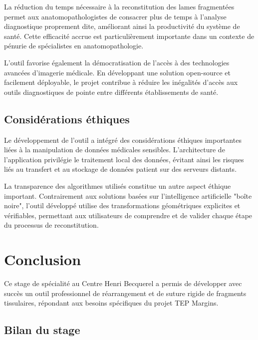 \documentclass[12pt,a4paper]{report}
\let\oldchapter\chapter
\renewcommand{\chapter}{\clearpage\oldchapter}
\begin{document}
\begin{}
\begin{}
\begin{}
La réduction du temps nécessaire à la reconstitution des lames fragmentées permet aux anatomopathologistes de consacrer plus de temps à l'analyse diagnostique proprement dite, améliorant ainsi la productivité du système de santé. Cette efficacité accrue est particulièrement importante dans un contexte de pénurie de spécialistes en anatomopathologie.

L'outil favorise également la démocratisation de l'accès à des technologies avancées d'imagerie médicale. En développant une solution open-source et facilement déployable, le projet contribue à réduire les inégalités d'accès aux outils diagnostiques de pointe entre différents établissements de santé.

\section{Considérations éthiques}

Le développement de l'outil a intégré des considérations éthiques importantes liées à la manipulation de données médicales sensibles. L'architecture de l'application privilégie le traitement local des données, évitant ainsi les risques liés au transfert et au stockage de données patient sur des serveurs distants.

La transparence des algorithmes utilisés constitue un autre aspect éthique important. Contrairement aux solutions basées sur l'intelligence artificielle "boîte noire", l'outil développé utilise des transformations géométriques explicites et vérifiables, permettant aux utilisateurs de comprendre et de valider chaque étape du processus de reconstitution.

\chapter{Conclusion}

\clearpage

\vspace{0.5em}

\begin{center}
Ce stage de spécialité au Centre Henri Becquerel a permis de développer avec succès un outil professionnel de réarrangement et de suture rigide de fragments tissulaires, répondant aux besoins spécifiques du projet TEP Margins.
\end{center}

\vspace{1em}

\section{Bilan du stage}


\end{}
\end{}
\end{}
\end{document}
